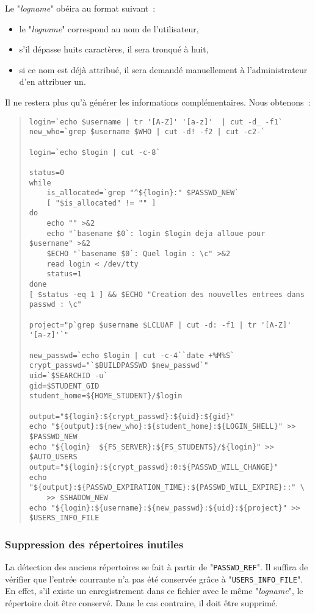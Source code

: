 Le "{\sl logname}" {\Unix} ob{\'e}ira au format suivant~:
\begin{itemize}
	\item	le "{\sl logname}" correspond au nom de l'utilisateur,
	\item	s'il d{\'e}passe huits caract{\`e}res, il sera tronqu{\'e} {\`a} huit,
	\item	si ce nom est d{\'e}j{\`a} attribu{\'e}, il sera demand{\'e} manuellement {\`a} l'administrateur
			d'en attribuer un.
\end{itemize}
Il ne restera plus qu'{\`a} g{\'e}n{\'e}rer les informations compl{\'e}mentaires. Nous obtenons~:
\begin{quote}
\begin{verbatim}
login=`echo $username | tr '[A-Z]' '[a-z]'  | cut -d_ -f1`
new_who=`grep $username $WHO | cut -d! -f2 | cut -c2-`

login=`echo $login | cut -c-8`

status=0
while
    is_allocated=`grep "^${login}:" $PASSWD_NEW`
    [ "$is_allocated" != "" ]
do
    echo "" >&2
    echo "`basename $0`: login $login deja alloue pour $username" >&2
    $ECHO "`basename $0`: Quel login : \c" >&2
    read login < /dev/tty
    status=1
done
[ $status -eq 1 ] && $ECHO "Creation des nouvelles entrees dans passwd : \c"

project="p`grep $username $LCLUAF | cut -d: -f1 | tr '[A-Z]' '[a-z]'`"

new_passwd=`echo $login | cut -c-4``date +%M%S`
crypt_passwd="`$BUILDPASSWD $new_passwd`"
uid=`$SEARCHID -u`
gid=$STUDENT_GID
student_home=${HOME_STUDENT}/$login

output="${login}:${crypt_passwd}:${uid}:${gid}"
echo "${output}:${new_who}:${student_home}:${LOGIN_SHELL}" >> $PASSWD_NEW
echo "${login}  ${FS_SERVER}:${FS_STUDENTS}/${login}" >> $AUTO_USERS
output="${login}:${crypt_passwd}:0:${PASSWD_WILL_CHANGE}"
echo "${output}:${PASSWD_EXPIRATION_TIME}:${PASSWD_WILL_EXPIRE}::" \
    >> $SHADOW_NEW
echo "${login}:${username}:${new_passwd}:${uid}:${project}" >> $USERS_INFO_FILE 
\end{verbatim}
\end{quote}

\subsubsection{\label{adv-programming-ex3-devlrm}Suppression des r{\'e}pertoires inutiles}

La d{\'e}tection des anciens r{\'e}pertoires se fait {\`a} partir de "{\tt PASSWD\_REF}". Il
suffira de v{\'e}rifier que l'entr{\'e}e courrante n'a pas {\'e}t{\'e} conserv{\'e}e gr{\^a}ce {\`a}
"{\tt USERS\_INFO\_FILE}". En effet, s'il existe un enregistrement dans ce
fichier avec le m{\^e}me "{\sl logname}", le r{\'e}pertoire doit {\^e}tre conserv{\'e}. Dans
le cas contraire, il doit {\^e}tre supprim{\'e}.

